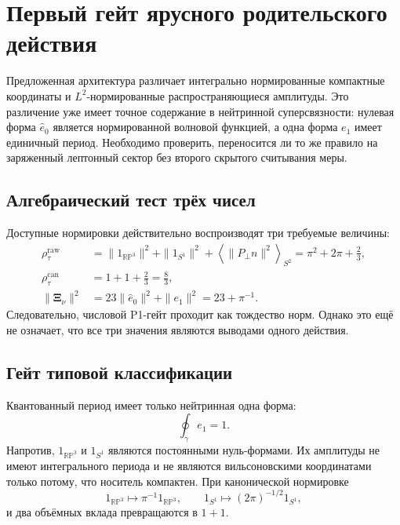 \chapter{Первый гейт ярусного родительского действия}

Предложенная архитектура различает интегрально нормированные компактные
координаты и \(L^2\)-нормированные распространяющиеся амплитуды. Это
различение уже имеет точное содержание в нейтринной суперсвязности:
нулевая форма \(\widehat e_0\) является нормированной волновой функцией, а
одна форма \(e_1\) имеет единичный период. Необходимо проверить, переносится
ли то же правило на заряженный лептонный сектор без второго скрытого
считывания меры.

\section{Алгебраический тест трёх чисел}

Доступные нормировки действительно воспроизводят три требуемые величины:
\begin{align}
 \rho_\tau^{\mathrm{raw}}
 &=\|1_{\mathbb{RP}^3}\|^2+
   \|1_{S^1}\|^2+
   \left\langle\|P_\perp n\|^2\right\rangle_{S^2}
 =\pi^2+2\pi+\frac23,\\
 \rho_\tau^{\mathrm{can}}
 &=1+1+\frac23=\frac83,\\
 \|\boldsymbol\Xi_\nu\|^2
 &=23\|\widehat e_0\|^2+\|e_1\|^2
 =23+\pi^{-1}.
\end{align}
Следовательно, числовой P1-гейт проходит как тождество норм. Однако это
ещё не означает, что все три значения являются выводами одного действия.

\section{Гейт типовой классификации}

Квантованный период имеет только нейтринная одна форма:
\begin{equation}
 \oint_\gamma e_1=1.
\end{equation}
Напротив, \(1_{\mathbb{RP}^3}\) и \(1_{S^1}\) являются постоянными
нуль-формами. Их амплитуды не имеют интегрального периода и не являются
вильсоновскими координатами только потому, что носитель компактен. При
канонической нормировке
\begin{equation}
 1_{\mathbb{RP}^3}\mapsto\pi^{-1}1_{\mathbb{RP}^3},
 \qquad
 1_{S^1}\mapsto(2\pi)^{-1/2}1_{S^1},
\end{equation}
и два объёмных вклада превращаются в \(1+1\).

